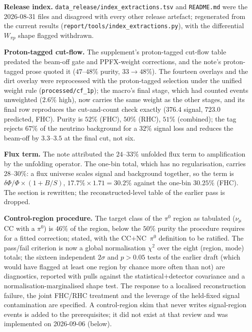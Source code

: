 \textbf{Release index.} \texttt{data\_release/index\_extractions.tsv} and \texttt{README.md}
were the 2026-08-31 files and disagreed with every other release artefact; regenerated
from the current results (\texttt{report/tools/index\_extractions.py}), with the
differential $W_{\pi p}$ shape flagged withdrawn.

\textbf{Proton-tagged cut-flow.} The supplement's proton-tagged cut-flow table predated
the beam-off gate and PPFX-weight corrections, and the note's proton-tagged prose quoted
it ($47$--$48\%$ purity, $33\to48\%$). The fourteen overlays and the dirt overlay were
reprocessed with the proton-tagged selection under the unified weight rule
(\texttt{processed/cf\_1p}); the macro's final stage, which had counted events
unweighted ($2.6\%$ high), now carries the same weight as the other stages, and its
final row reproduces the cut-and-count check exactly ($376.4$ signal, $723.0$ predicted,
FHC). Purity is $52\%$ (FHC), $50\%$ (RHC), $51\%$ (combined); the tag rejects $67\%$ of
the neutrino background for a $32\%$ signal loss and reduces the beam-off by
$3.3$--$3.5$ at the final cut, not six.

\textbf{Flux term.} The note attributed the $24$--$33\%$ unfolded flux term to amplification
by the unfolding operator. The one-bin total, which has no regularisation, carries
$28$--$30\%$: a flux universe scales signal and background together, so the term is
$\delta\Phi/\Phi\times(1+B/S)$, $17.7\%\times1.71=30.2\%$ against the one-bin $30.25\%$
(FHC). The section is rewritten; the reconstructed-level table of the earlier pass is
dropped.

\textbf{Control-region procedure.} The target class of the $\pi^0$ region as tabulated
($\nu_\mu$CC with a $\pi^0$) is $46\%$ of the region, below the $50\%$ purity the
procedure requires for a fitted correction; stated, with the CC$+$NC~$\pi^0$ definition
to be ratified. The pass/fail criterion is now a global normalisation $\chi^2$ over the
eight (region, mode) totals; the sixteen independent $2\sigma$ and $p>0.05$ tests of the
earlier draft (which would have flagged at least one region by chance more often than
not) are diagnostics, reported with pulls against the statistical$+$detector covariance
and a normalisation-marginalised shape test. The response to a localised reconstruction
failure, the joint FHC/RHC treatment and the leverage of the held-fixed signal
contamination are specified. A control-region skim that never writes signal-region
events is added to the prerequisites; it did not exist at that review and was implemented
on 2026-09-06 (below).

